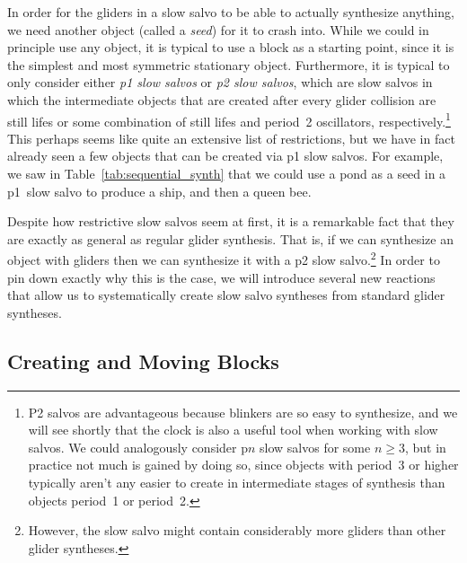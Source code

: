 In order for the gliders in a slow salvo to be able to actually synthesize anything, we need another object (called a \emph{seed}) for it to crash into. While we could in principle use any object, it is typical to use a block as a starting point, since it is the simplest and most symmetric stationary object. Furthermore, it is typical to only consider either \emph{p1 slow salvos} or \emph{p2 slow salvos}, which are slow salvos in which the intermediate objects that are created after every glider collision are still lifes or some combination of still lifes and period~2 oscillators, respectively.\footnote{P2 salvos are advantageous because blinkers are so easy to synthesize, and we will see shortly that the clock is also a useful tool when working with slow salvos. We could analogously consider p$n$ slow salvos for some $n \geq 3$, but in practice not much is gained by doing so, since objects with period~3 or higher typically aren't any easier to create in intermediate stages of synthesis than objects period~1 or period~2.} This perhaps seems like quite an extensive list of restrictions, but we have in fact already seen a few objects that can be created via p1 slow salvos. For example, we saw in Table~\ref{tab:sequential_synth} that we could use a pond as a seed in a p1~slow salvo to produce a ship, and then a queen bee. %

Despite how restrictive slow salvos seem at first, it is a remarkable fact that they are exactly as general as regular glider synthesis. That is, if we can synthesize an object with gliders then we can synthesize it with a p2 slow salvo.\footnote{However, the slow salvo might contain considerably more gliders than other glider syntheses.} In order to pin down exactly why this is the case, we will introduce several new reactions that allow us to systematically create slow salvo syntheses from standard glider syntheses.


\subsection{Creating and Moving Blocks}\label{sec:slow_salvo_blocks}

